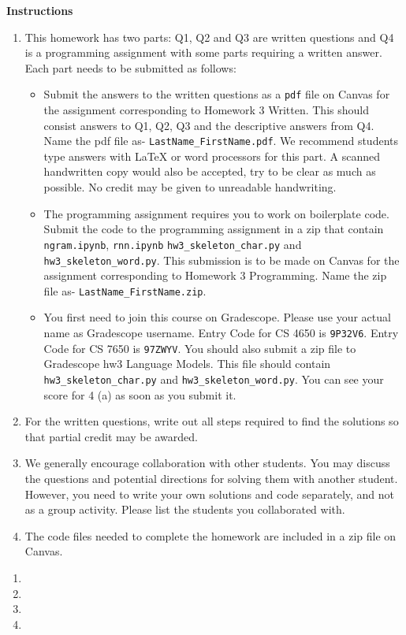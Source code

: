 \documentclass[12pt]{article}
\begin{document}

\textbf{Instructions}
\begin{enumerate}

    \item This homework has two parts: Q1, Q2 and Q3 are written questions and Q4 is a programming assignment with some parts requiring a written answer. Each part needs to be submitted as follows:
    \begin{itemize}
        \item Submit the answers to the written questions as a \texttt{pdf} file on Canvas for the assignment corresponding to Homework 3 Written. This should consist answers to Q1, Q2, Q3 and the descriptive answers from Q4. Name the pdf file as- \texttt{LastName\_FirstName.pdf}.  We recommend students type answers with LaTeX or word processors for this part. A scanned handwritten copy would also be accepted, try to be clear as much as possible. No credit may be given to unreadable handwriting. 
        \item The programming assignment requires you to work on boilerplate code. Submit the code to the programming assignment in a zip that contain \texttt{ngram.ipynb}, \texttt{rnn.ipynb} \texttt{hw3\_skeleton\_char.py} and \texttt{hw3\_skeleton\_word.py}. This submission is to be made on Canvas for the assignment corresponding to Homework 3 Programming. Name the zip file as- \texttt{LastName\_FirstName.zip}.
        
        \item You first need to join this course on Gradescope. Please use your actual name as Gradescope username. Entry Code for CS 4650 is \texttt{9P32V6}. Entry Code for CS 7650 is \texttt{97ZWYV}. You should also submit a zip file to Gradescope hw3 Language Models. This file should contain \texttt{hw3\_skeleton\_char.py} and \texttt{hw3\_skeleton\_word.py}. You can see your score for 4 (a) as soon as you submit it.
    \end{itemize}

    \item For the written questions, write out all steps required to find the solutions so that partial credit may be awarded.
    \item We generally encourage collaboration with other students. You may discuss the questions and potential directions for solving them with another student. However, you need to write your own solutions and code separately, and not as a group activity. Please list the students you collaborated with.
    \item The code files needed to complete the homework are included in a zip file on Canvas.
\end{enumerate}

\pagebreak

 \begin{enumerate}
   \item  %
   \item  %
   \pagebreak
   \item  %
   \item  %
 \end{enumerate}
\end{document}

